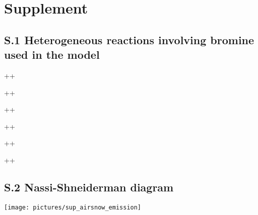 \documentclass[manuscript]{copernicus}
\begin{document}
\clearpage
\setcounter{page}{1}

\section*{Supplement}
\subsection*{S.1 Heterogeneous reactions involving bromine used in the model}
\begin{reaction}
  +\rightarrow{}+
\end{reaction}
\begin{reaction}
  +\rightarrow{}+
\end{reaction}
\begin{reaction}
  +\rightarrow{}+
\end{reaction}
\begin{reaction}
  +\rightarrow{}+
\end{reaction}
\begin{reaction}
  +\rightarrow{}+
\end{reaction}
\begin{reaction}
  +\rightarrow{}+
\end{reaction}
%
\subsection*{S.2 Nassi-Shneiderman diagram}
\begin{center}
\texttt{[image: pictures/sup\_airsnow\_emission]}
\end{center}
%
\end{document}

